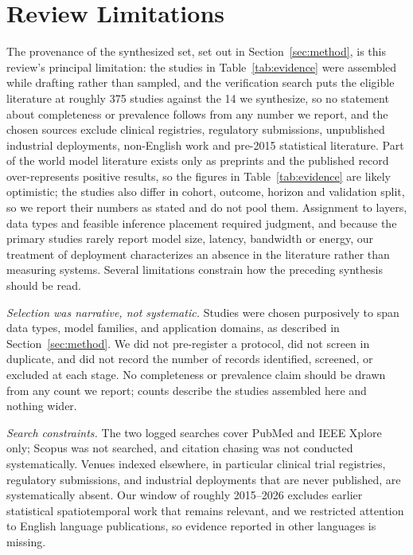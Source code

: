 \documentclass[journal]{IEEEtran}
\newif\ifsubmission
\begin{document}
\section{Review Limitations}
\label{sec:limitations}
\ifsubmission
The provenance of the synthesized set, set out in Section~\ref{sec:method}, is this review's principal limitation: the studies in Table~\ref{tab:evidence} were assembled while drafting rather than sampled, and the verification search puts the eligible literature at roughly 375 studies against the 14 we synthesize, so no statement about completeness or prevalence follows from any number we report, and the chosen sources exclude clinical registries, regulatory submissions, unpublished industrial deployments, non-English work and pre-2015 statistical literature. Part of the world model literature exists only as preprints and the published record over-represents positive results, so the figures in Table~\ref{tab:evidence} are likely optimistic; the studies also differ in cohort, outcome, horizon and validation split, so we report their numbers as stated and do not pool them. Assignment to layers, data types and feasible inference placement required judgment, and because the primary studies rarely report model size, latency, bandwidth or energy, our treatment of deployment characterizes an absence in the literature rather than measuring systems.
\else
Several limitations constrain how the preceding synthesis should be read.

\emph{Selection was narrative, not systematic.} Studies were chosen purposively to span data types, model families, and application domains, as described in Section~\ref{sec:method}. We did not pre-register a protocol, did not screen in duplicate, and did not record the number of records identified, screened, or excluded at each stage. No completeness or prevalence claim should be drawn from any count we report; counts describe the studies assembled here and nothing wider.

\emph{Search constraints.} The two logged searches cover PubMed and IEEE Xplore only; Scopus was not searched, and citation chasing was not conducted systematically. Venues indexed elsewhere, in particular clinical trial registries, regulatory submissions, and industrial deployments that are never published, are systematically absent. Our window of roughly 2015--2026 excludes earlier statistical spatiotemporal work that remains relevant, and we restricted attention to English language publications, so evidence reported in other languages is missing.
\end{document}
